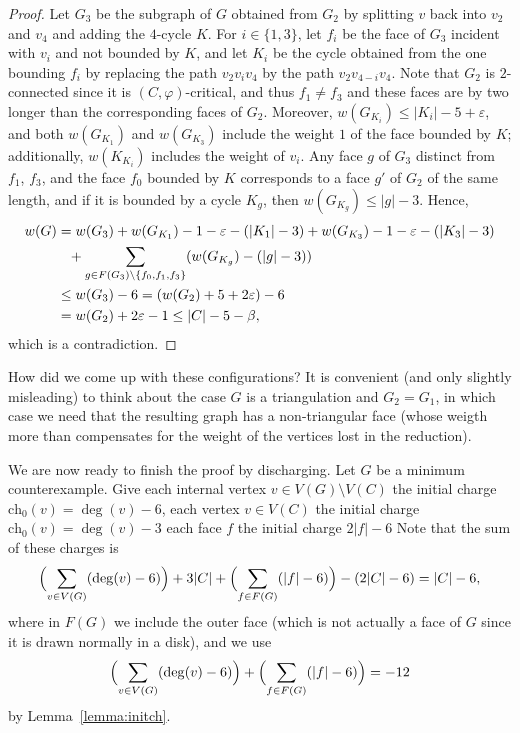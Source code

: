 \documentclass[12pt,twoside,openright,a4paper]{book}
\newcommand{\initch}{\text{ch}_0}
\begin{document}
\begin{proof}
Let $G_3$ be the subgraph of $G$ obtained from $G_2$ by splitting $v$ back into $v_2$ and $v_4$
and adding the $4$-cycle $K$.  For $i\in \{1,3\}$, let $f_i$ be the face of $G_3$ incident with $v_i$
and not bounded by $K$, and let $K_i$ be the cycle obtained from the one bounding $f_i$ by replacing
the path $v_2v_iv_4$ by the path $v_2v_{4-i}v_4$.
Note that $G_2$ is $2$-connected since it is $(C,\varphi)$-critical, and thus $f_1\neq f_3$
and these faces are by two longer than the corresponding faces of $G_2$.
Moreover, $w(G_{K_i})\le |K_i|-5+\varepsilon$, and both $w(G_{K_1})$ and $w(G_{K_3})$ include
the weight $1$ of the face bounded by $K$; additionally, $w(K_{K_i})$ includes the weight of $v_i$.
Any face $g$ of $G_3$ distinct from $f_1$, $f_3$, and the face $f_0$ bounded by $K$
corresponds to a face $g'$ of $G_2$ of the same length, and if it is bounded by a cycle $K_g$, then $w(G_{K_g})\le |g|-3$.
Hence,
\begin{align*}
w(G)&=w(G_3)+w(G_{K_1})-1-\varepsilon-(|K_1|-3)+w(G_{K_3})-1-\varepsilon-(|K_3|-3)\\
&\hphantom{=}+\sum_{g\in F(G_3)\setminus\{f_0,f_1,f_3\}} (w(G_{K_g})-(|g|-3))\\
&\le w(G_3)-6=(w(G_2)+5+2\varepsilon)-6\\
&=w(G_2)+2\varepsilon-1\le |C|-5-\beta,
\end{align*}
which is a contradiction.
\end{proof}

How did we come up with these configurations? It is convenient (and only slightly misleading) to think about the
case $G$ is a triangulation and $G_2=G_1$, in which case we need that the resulting graph has a non-triangular
face (whose weigth more than compensates for the weight of the vertices lost in the reduction).

We are now ready to finish the proof by discharging.  Let $G$ be a minimum counterexample.
Give each internal vertex $v\in V(G)\setminus V(C)$ the initial charge $\initch(v)=\deg(v)-6$,
each vertex $v\in V(C)$ the initial charge $\initch(v)=\deg(v)-3$ each face $f$
the initial charge $2|f|-6$  Note that the sum of these charges is
$$\Bigl(\sum_{v\in V(G)} (\deg(v)-6)\Bigr)+3|C|+\Bigl(\sum_{f\in F(G)} (|f|-6)\Bigr)-(2|C|-6)=|C|-6,$$
where in $F(G)$ we include the outer face (which is not actually a face of $G$ since it is drawn normally in a disk),
and we use
$$\Bigl(\sum_{v\in V(G)} (\deg(v)-6)\Bigr)+\Bigl(\sum_{f\in F(G)} (|f|-6)\Bigr)=-12$$
by Lemma~\ref{lemma:initch}.
\end{document}
